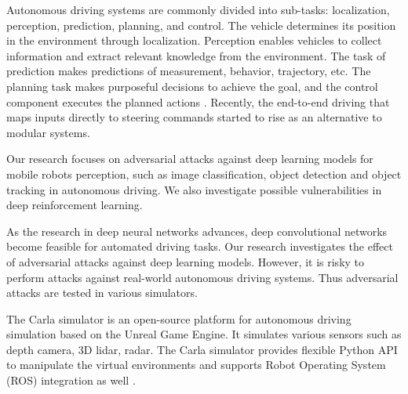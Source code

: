 
Autonomous driving systems are commonly divided into sub-tasks: localization, perception, prediction, planning, and control. The vehicle determines its position in the environment through localization. Perception enables vehicles to collect information and extract relevant knowledge from the environment. The task of prediction makes predictions of measurement, behavior, trajectory, etc. The planning task makes purposeful decisions to achieve the goal, and the control component executes the planned actions \citep{pendleton2017perception}. Recently, the end-to-end driving that maps inputs directly to steering commands started to rise as an alternative to modular systems.

Our research focuses on adversarial attacks against deep learning models for mobile robots perception, such as image classification, object detection and object tracking in autonomous driving. We also investigate possible vulnerabilities in deep reinforcement learning.



As the research in deep neural networks advances, deep convolutional networks become feasible for automated driving tasks. Our research investigates the effect of adversarial attacks against deep learning models. However, it is risky to perform attacks against real-world autonomous driving systems. Thus adversarial attacks are tested in various simulators.

The Carla simulator is an open-source platform for autonomous driving simulation based on the Unreal Game Engine. It simulates various sensors such as depth camera, 3D lidar, radar. The Carla simulator provides flexible Python API to manipulate the virtual environments and supports Robot Operating System (ROS) integration as well \citep{Dosovitskiy17}.

